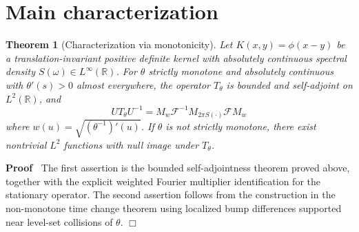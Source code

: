 \documentclass{article}
\newcommand{\cdummy}{\cdot}
\newenvironment{proof}{\noindent\textbf{Proof\ }}{\hspace*{\fill}$\Box$\medskip}
{\theorembodyfont{\rmfamily}\newtheorem{example}{Example}}
\newtheorem{theorem}{Theorem}
\begin{document}
\section{Main characterization}

\begin{theorem}[Characterization via monotonicity]
  Let $K (x, y) = \phi (x - y)$ be a translation-invariant positive definite
  kernel with absolutely continuous spectral density $S (\omega) \in
  L^{\infty} (\mathbb{R})$. For $\theta$ strictly monotone and absolutely
  continuous with $\theta' (s) > 0$ almost everywhere, the operator
  $T_{\theta}$ is bounded and self-adjoint on $L^2 (\mathbb{R})$, and
  \begin{equation}
    UT_{\theta} U^{- 1} = M_w \mathcal{F}^{- 1} M_{2 \pi S (\cdummy)}
    \mathcal{F}M_w
  \end{equation}
  where $w (u) = \sqrt{(\theta^{- 1})' (u)}$. If $\theta$ is not strictly
  monotone, there exist nontrivial $L^2$ functions with null image under
  $T_{\theta}$.
\end{theorem}

\begin{proof}
  The first assertion is the bounded self-adjointness theorem proved above,
  together with the explicit weighted Fourier multiplier identification for
  the stationary operator. The second assertion follows from the construction
  in the non-monotone time change theorem using localized bump differences
  supported near level-set collisions of $\theta$.
\end{proof}
\end{document}
